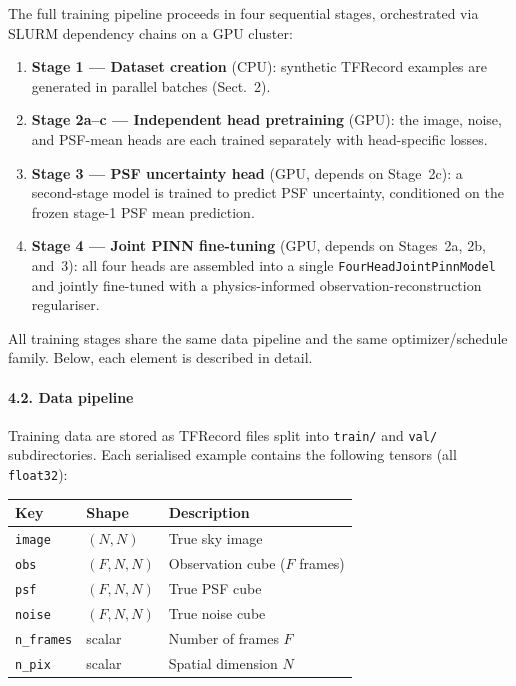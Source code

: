 \documentclass{aa}
\begin{document}
The full training pipeline proceeds in four sequential stages, orchestrated via SLURM dependency chains on a GPU cluster:
\begin{enumerate}
    \item \textbf{Stage 1 --- Dataset creation} (CPU): synthetic TFRecord examples are generated in parallel batches (Sect.~2).
    \item \textbf{Stage 2a--c --- Independent head pretraining} (GPU): the image, noise, and PSF-mean heads are each trained separately with head-specific losses.
    \item \textbf{Stage 3 --- PSF uncertainty head} (GPU, depends on Stage~2c): a second-stage model is trained to predict PSF uncertainty, conditioned on the frozen stage-1 PSF mean prediction.
    \item \textbf{Stage 4 --- Joint PINN fine-tuning} (GPU, depends on Stages~2a, 2b, and~3): all four heads are assembled into a single \texttt{FourHeadJointPinnModel} and jointly fine-tuned with a physics-informed observation-reconstruction regulariser.
\end{enumerate}

All training stages share the same data pipeline and the same optimizer/schedule family. Below, each element is described in detail.

\paragraph{4.2. Data pipeline}

Training data are stored as TFRecord files split into \texttt{train/} and \texttt{val/} subdirectories. Each serialised example contains the following tensors (all \texttt{float32}):

\begin{table}[h]
\centering
\begin{tabular}{|l|l|l|}
\hline
\textbf{Key} & \textbf{Shape} & \textbf{Description} \\
\hline
\texttt{image} & $(N, N)$ & True sky image \\
\texttt{obs} & $(F, N, N)$ & Observation cube ($F$ frames) \\
\texttt{psf} & $(F, N, N)$ & True PSF cube \\
\texttt{noise} & $(F, N, N)$ & True noise cube \\
\texttt{n\_frames} & scalar & Number of frames $F$ \\
\texttt{n\_pix} & scalar & Spatial dimension $N$ \\
\hline
\end{tabular}
\end{table}
\end{document}
